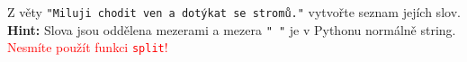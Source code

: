 \question[50]
Z věty \texttt{"Miluji chodit ven a dotýkat se stromů."} vytvořte seznam jejích
slov.\\
\textbf{Hint:} Slova jsou oddělena mezerami a mezera \texttt{"~"} je v Pythonu
normálně string.\\
\textcolor{red}{Nesmíte použít funkci \texttt{split}!}